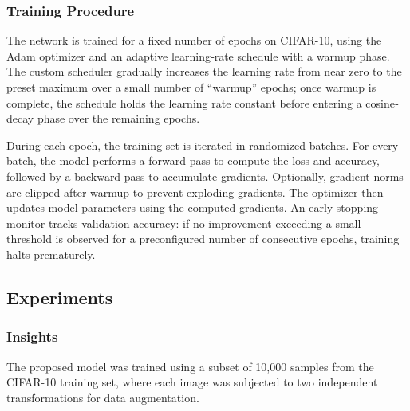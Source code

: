 \documentclass{article}
\begin{document}
\subsubsection{Training Procedure}

The network is trained for a fixed number of epochs on CIFAR-10, using the Adam optimizer and an adaptive learning‐rate schedule with a warmup phase. The custom scheduler gradually increases the learning rate from near zero to the preset maximum over a small number of “warmup” epochs; once warmup is complete, the schedule holds the learning rate constant before entering a cosine‐decay phase over the remaining epochs.

During each epoch, the training set is iterated in randomized batches. For every batch, the model performs a forward pass to compute the loss and accuracy, followed by a backward pass to accumulate gradients. Optionally, gradient norms are clipped after warmup to prevent exploding gradients. The optimizer then updates model parameters using the computed gradients. An early‐stopping monitor tracks validation accuracy: if no improvement exceeding a small threshold is observed for a preconfigured number of consecutive epochs, training halts prematurely.

\subsection{Experiments}

\subsubsection{Insights}

The proposed model was trained using a subset of 10,000 samples from the CIFAR-10 training set, where each image was subjected to two independent transformations for data augmentation.
\end{document}
